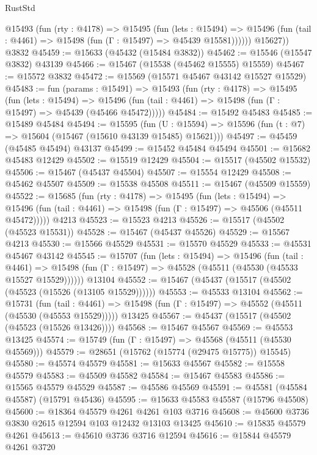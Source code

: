 \begin{lexlean}{RustStd}
\begin{coremodule}
          @15493
            (fun (rty : @4178) =>
            @15495
              (fun (lets : @15494) =>
              @15496 (fun (tail : @4461) => @15498 (fun (Γ : @15497) => @45439 @15581))))))
        @15627))
    @3832
@45459 := @15633 (@45432 (@15484 @3832))
@45462 := @15546 (@15547 @3832) @43139
@45466 := @15467 (@15538 (@45462 @15555) @15559)
@45467 := @15572 @3832
@45472 := @15569 (@15571 @45467 @43142 @15527 @15529)
@45483 := fun (params : @15491) =>
  @15493
    (fun (rty : @4178) =>
    @15495
      (fun (lets : @15494) =>
      @15496 (fun (tail : @4461) => @15498 (fun (Γ : @15497) => @45439 (@45466 @45472)))))
@45484 := @15492 @45483
@45485 := @15489 @45484
@45494 := @15595
    (fun (U : @15594) => @15596 (fun (t : @7) => @15604 (@15467 (@15610 @43139 @15485) @15621)))
@45497 := @45459 (@45485 @45494) @43137
@45499 := @15452 @45484 @45494
@45501 := @15682 @45483 @12429
@45502 := @15519 @12429
@45504 := @15517 (@45502 @15532)
@45506 := @15467 (@45437 @45504)
@45507 := @15554 @12429
@45508 := @45462 @45507
@45509 := @15538 @45508
@45511 := @15467 (@45509 @15559)
@45522 := @15685
    (fun (rty : @4178) =>
    @15495
      (fun (lets : @15494) =>
      @15496 (fun (tail : @4461) => @15498 (fun (Γ : @15497) => @45506 (@45511 @45472)))))
    @4213
@45523 := @15523 @4213
@45526 := @15517 (@45502 (@45523 @15531))
@45528 := @15467 (@45437 @45526)
@45529 := @15567 @4213
@45530 := @15566 @45529
@45531 := @15570 @45529
@45533 := @45531 @45467 @43142
@45545 := @15707
    (fun (lets : @15494) =>
    @15496
      (fun (tail : @4461) =>
      @15498 (fun (Γ : @15497) => @45528 (@45511 (@45530 (@45533 @15527 @15529))))))
    @13104
@45552 := @15467 (@45437 (@15517 (@45502 (@45523 (@15526 (@13105 @15529))))))
@45553 := @45533 @13104
@45562 := @15731
    (fun (tail : @4461) => @15498 (fun (Γ : @15497) => @45552 (@45511 (@45530 (@45553 @15529)))))
    @13425
@45567 := @45437 (@15517 (@45502 (@45523 (@15526 @13426))))
@45568 := @15467 @45567
@45569 := @45553 @13425
@45574 := @15749 (fun (Γ : @15497) => @45568 (@45511 (@45530 @45569)))
@45579 := @28651 (@15762 (@15774 (@29475 @15775)) @15545)
@45580 := @45574 @45579
@45581 := @15633 @45567
@45582 := @15558 @45579
@45583 := @45509 @45582
@45584 := @15467 @45583
@45586 := @15565 @45579 @45529
@45587 := @45586 @45569
@45591 := @45581 (@45584 @45587) (@15791 @45436)
@45595 := @15633 @45583 @45587 (@15796 @45508)
@45600 := @18364 @45579 @4261 @4261 @103 @3716
@45608 := @45600 @3736 @3830 @2615 @12594 @103 @12432 @13103 @13425
@45610 := @15835 @45579 @4261
@45613 := @45610 @3736 @3716 @12594
@45616 := @15844 @45579 @4261 @3720

\end{coremodule}
\end{lexlean}
